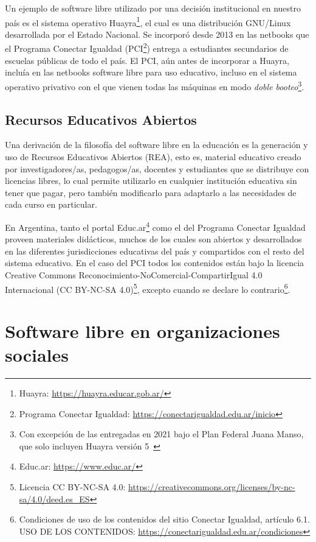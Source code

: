 Un ejemplo de software libre utilizado por una decisión institucional en nuestro país es el sistema operativo Huayra\footnote{Huayra: \url{https://huayra.educar.gob.ar/}}, el cual es una distribución GNU/Linux desarrollada por el Estado Nacional. Se incorporó desde 2013 en las netbooks que el Programa Conectar Igualdad (PCI\footnote{Programa Conectar Igualdad: \url{https://conectarigualdad.edu.ar/inicio}}) entrega a estudiantes secundarios de escuelas públicas de todo el país. El PCI, aún antes de incorporar a Huayra, incluía en las netbooks software libre para uso educativo, incluso en el sistema operativo privativo con el que vienen todas las máquinas en modo \emph{doble booteo}\footnote{Con excepción de las entregadas en 2021 bajo el Plan Federal Juana Manso, que solo incluyen Huayra versión 5~\cite{distefano21}}.

\subsection{Recursos Educativos Abiertos}

Una derivación de la filosofía del software libre en la educación es la generación y uso de Recursos Educativos Abiertos (REA), esto es, material educativo creado por investigadores/as, pedagogos/as, docentes y estudiantes que se distribuye con licencias libres, lo cual permite utilizarlo en cualquier institución educativa sin tener que pagar, pero también modificarlo para adaptarlo a las necesidades de cada curso en particular. 

En Argentina, tanto el portal Educ.ar\footnote{Educ.ar: \url{https://www.educ.ar/}} como el del Programa Conectar Igualdad proveen materiales didácticos, muchos de los cuales son abiertos y desarrollados en las diferentes jurisdicciones educativas del país y compartidos con el resto del sistema educativo. En el caso del PCI todos los contenidos están bajo la licencia Creative Commons Reconocimiento-NoComercial-CompartirIgual 4.0 Internacional (CC BY-NC-SA 4.0)\footnote{Licencia CC BY-NC-SA 4.0: \url{https://creativecommons.org/licenses/by-nc-sa/4.0/deed.es_ES}}, excepto cuando se declare lo contrario\footnote{Condiciones de uso de los contenidos del sitio Conectar Igualdad, artículo 6.1. USO DE LOS CONTENIDOS: \url{https://conectarigualdad.edu.ar/condiciones}}.


\section{Software libre en organizaciones sociales}


